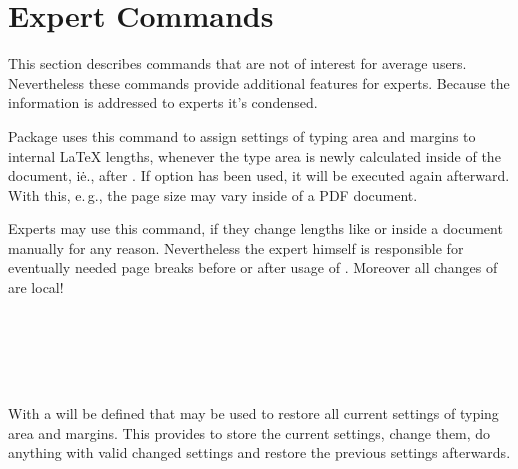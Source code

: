 \section{Expert Commands}

This section describes commands that are not of interest for average
users. Nevertheless these commands provide additional features for
experts. Because the information is addressed to experts it's condensed.

\begin{Declaration}
\end{Declaration}%
%
Package  uses this command to assign settings of typing area
and margins to internal \LaTeX{} lengths, whenever the type area is newly
calculated inside of the document, i\.e., after
. If option  has been used,
it will be executed again afterward. With this, e.\,g., the page size may vary
inside of a PDF document.

Experts may use this command, if they change lengths like 
or  inside a document manually for any reason. Nevertheless
the expert himself is responsible for eventually needed page breaks before or
after usage of . Moreover all changes of
 are local!%
% 

\begin{Declaration}
  \\
  \\
  \\
  \\
\end{Declaration}
%
%
%
%
%
With  a  will be defined that may be
used to restore all current settings of typing area and margins. This provides
to store the current settings, change them, do anything with valid changed
settings and restore the previous settings afterwards.

